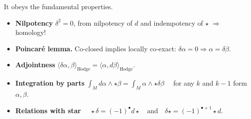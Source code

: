 \documentclass[../geometry_main.tex]{subfiles}
\begin{document}
\begin{mytheorem}
\noindent
It obeys the fundamental properties.
\begin{itemize}
    \item \textbf{Nilpotency} \(\delta^2 = 0\), from nilpotency of $d$ and indempotency of $\star$ $\Rightarrow$ homology!
    \item \textbf{Poincaré lemma.} Co-closed implies locally co-exact: \(\delta \alpha = 0 \Rightarrow \alpha = \delta \beta\).
    \item \textbf{Adjointness} \(\langle \delta \alpha, \beta \rangle_{\mathrm{Hodge}} = \langle \alpha, d \beta \rangle_{\mathrm{Hodge}}\).
    \item \textbf{Integration by parts} $\displaystyle \int_M d\alpha \wedge \star \beta = \int_M \alpha \wedge \star \delta \beta \quad $ for any \(k\) and $k\!-\!1$ form \(\alpha,\beta\).

    \item \textbf{Relations with star} {$\quad \displaystyle\star \delta = (-1)^{\bullet} d \star \quad \text{and} \quad \delta \star = (-1)^{\bullet +1} \star d.$}
\end{itemize}

\end{mytheorem}
\end{document}
